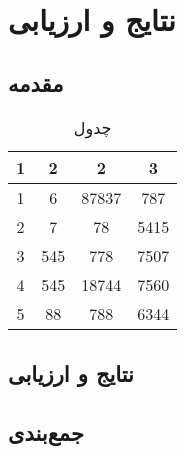 \chapter{نتایج و ارزیابی}
\section{مقدمه}


\begin{table}[h!]
    \centering
    \begin{tabular}{||c c c c||} 
     \hline
     1 & 2 & 2 & 3 \\ [0.5ex] 
     \hline\hline
     1 & 6 & 87837 & 787 \\ 
     2 & 7 & 78 & 5415 \\
     3 & 545 & 778 & 7507 \\
     4 & 545 & 18744 & 7560 \\
     5 & 88 & 788 & 6344 \\ [1ex] 
     \hline
    \end{tabular}
    \caption{چدول}
    \label{table:1}
    \end{table}



\section{نتایج و ارزیابی}

\section{جمع‌بندی}